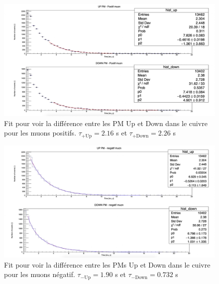 \documentclass[12pt]{article}
\begin{document}
\begin{figure}[htpb!]
    \centering
    \includegraphics[width=1.0\textwidth]{Images/Photos/UpDownPositifMuonCuivre.jpeg}
    \caption{Fit pour voir la différence entre les PM Up et Down dans le cuivre pour les muons positifs. $\tau_{+\text{Up}}=2.16$ \SIUnitSymbolMicro s et $\tau_{+\text{Down}}=2.26$ \SIUnitSymbolMicro s }
    \label{fig:UpDownPositifMuonCuivre}
\end{figure}

\begin{figure}[htpb!]
    \centering
    \includegraphics[width=1.0\textwidth]{Images/Photos/UpDownNegatifMuonCuivre.jpeg}
    \caption{Fit pour voir la différence entre les PMs Up et Down dans le cuivre pour les muons négatif. $\tau_{-\text{Up}}=1.90$ \SIUnitSymbolMicro s et $\tau_{-\text{Down}}=0.732$ \SIUnitSymbolMicro s}
    \label{fig:UpDownNegatifMuonCuivre}
\end{figure}
\end{document}
